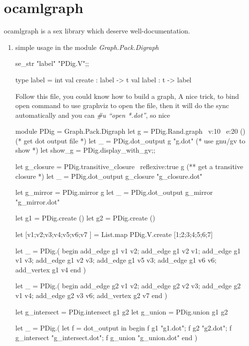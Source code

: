 \section{ocamlgraph}
\label{sec:ocamlgraph}

ocamlgraph is a sex library which deserve well-documentation.

\begin{enumerate}
\item simple usage in the module \textit{Graph.Pack.Digraph}

  \begin{redcode}
  se_str "label" "PDig.V";;
\end{redcode}

\begin{bluecode}
  type label = int
  val create : label -> t
  val label : t -> label    
\end{bluecode}

Follow this file, you could know how to build a graph,
A nice trick, to bind open command to use graphviz to open the 
file, then it will do the sync automatically 
and you can \textit{\#u ``open *.dot''}, so nice
\begin{bluecode}
module PDig = Graph.Pack.Digraph
let g = PDig.Rand.graph ~v:10 ~e:20 () 
(* get dot output file *)
let _ = PDig.dot_output g "g.dot" 
(* use gnu/gv to show *)
let show_g = PDig.display_with_gv;;

let g_closure = PDig.transitive_closure ~reflexive:true g 
(** get a transitive closure *)
let _ = PDig.dot_output g_closure "g_closure.dot"

let g_mirror = PDig.mirror g 
let _ = PDig.dot_output g_mirror "g_mirror.dot"

let g1 = PDig.create ()
let g2 = PDig.create ()


let [v1;v2;v3;v4;v5;v6;v7 ] = List.map PDig.V.create [1;2;3;4;5;6;7]

let _ = PDig.( begin
  add_edge g1 v1 v2;
  add_edge g1 v2 v1;
  add_edge g1 v1 v3;
  add_edge g1 v2 v3;
  add_edge g1 v5 v3;
  add_edge g1 v6 v6;
  add_vertex g1 v4
  end 
)

let _ = PDig.( begin
  add_edge g2 v1 v2;
  add_edge g2 v2 v3;
  add_edge g2 v1 v4;
  add_edge g2 v3 v6;
  add_vertex g2 v7
end
)

let g_intersect = PDig.intersect g1 g2 
let g_union = PDig.union g1 g2 

let _ = 
  PDig.(
    let f = dot_output in begin
    f g1 "g1.dot";
    f g2 "g2.dot";
    f g_intersect "g_intersect.dot"; 
    f g_union "g_union.dot"
    end 
  )
\end{bluecode}


\end{enumerate}
